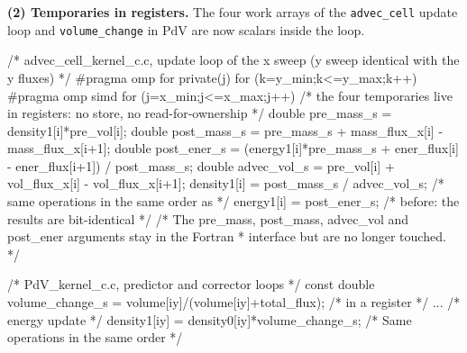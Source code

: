 \documentclass[a4paper,11pt]{article}
\newcommand{\kernel}[1]{\texttt{#1}}
\begin{document}
\textbf{(2) Temporaries in registers.}
The four work arrays of the \kernel{advec\_cell} update loop and \texttt{volume\_change} in PdV are now scalars inside the loop.
\begin{code}
/* advec_cell_kernel_c.c, update loop of the x sweep (y sweep identical with the y fluxes) */
#pragma omp for private(j)
for (k=y_min;k<=y_max;k++) {
#pragma omp simd
  for (j=x_min;j<=x_max;j++) {
    /* the four temporaries live in registers: no store, no read-for-ownership */
    double pre_mass_s  = density1[i]*pre_vol[i];
    double post_mass_s = pre_mass_s + mass_flux_x[i] - mass_flux_x[i+1];
    double post_ener_s = (energy1[i]*pre_mass_s + ener_flux[i] - ener_flux[i+1]) / post_mass_s;
    double advec_vol_s = pre_vol[i] + vol_flux_x[i] - vol_flux_x[i+1];
    density1[i] = post_mass_s / advec_vol_s;   /* same operations in the same order as  */
    energy1[i]  = post_ener_s;                 /* before: the results are bit-identical */
  }
}
/* The pre_mass, post_mass, advec_vol and post_ener arguments stay in the Fortran
 * interface but are no longer touched. */
\end{code}
\begin{code}
/* PdV_kernel_c.c, predictor and corrector loops */
const double volume_change_s = volume[iy]/(volume[iy]+total_flux);  /* in a register */
...                                                                 /* energy update */
density1[iy] = density0[iy]*volume_change_s;
/* Same operations in the same order */
\end{code}
\end{document}
